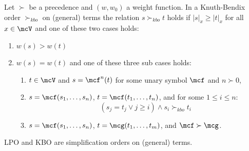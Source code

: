 \begin{definition}[KBO]\label{def:kbo}
	Let \( \succ \) be a precedence and \( (w,w_0) \) a weight function.
	In a Knuth-Bendix order \( \succ_{kbo} \) on (general) terms the relation \( s\succ_{kbo} t \) holds if
	\( |s|_x\geq|t|_x \) for all \( x\in\mcV \) and one of these two cases holds:
	\begin{enumerate}
		\item \( w(s) > w(t) \)
		\item \( w(s) = w(t) \) and one of these three sub cases holds:
		\begin{enumerate}
			\item \( t\in\mcV \) and \( s=\mcf^n(t) \) for some unary symbol \( \mcf \) and \( n\succ0 \),
			\item \( s=\mcf(s_1,\ldots,s_n) \), \( t=\mcf(t_1,\ldots,t_n) \), and for some \( 1\leq i\leq n \):
			\[
			(s_j=t_j \lor j\geq i) \land s_i\succ_{kbo} t_i
			\]
			\item \( s=\mcf(s_1,\ldots,s_n) \), \( t=\mcg(t_1,\ldots,t_m) \), and \( \mcf\succ\mcg \).
		\end{enumerate}
	\end{enumerate}
\end{definition}

\begin{lemma}
	LPO and KBO are simplification orders on (general) terms.
\end{lemma}


